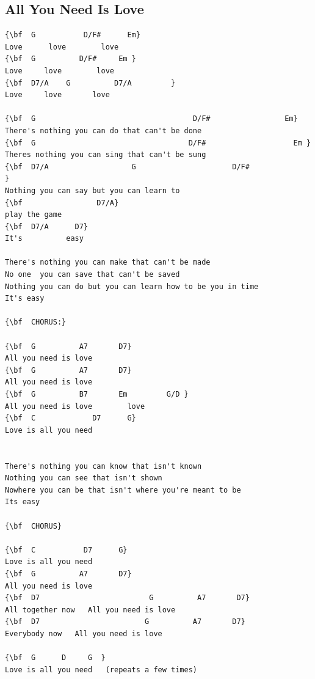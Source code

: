 \documentclass[a4paper]{article}
\begin{document}
\subsection{All You Need Is Love}
\begin{Verbatim}[commandchars=\\\{\}]
{\bf  G           D/F#      Em}
Love      love        love     
{\bf  G          D/F#     Em }
Love     love        love      
{\bf  D7/A    G          D7/A         }
Love     love       love

{\bf  G                                    D/F#                 Em}
There's nothing you can do that can't be done
{\bf  G                                   D/F#                    Em }
Theres nothing you can sing that can't be sung
{\bf  D7/A                   G                      D/F#                    }
Nothing you can say but you can learn to
{\bf                 D7/A}
play the game
{\bf  D7/A      D7}
It's          easy

There's nothing you can make that can't be made
No one  you can save that can't be saved
Nothing you can do but you can learn how to be you in time
It's easy

{\bf  CHORUS:}

{\bf  G          A7       D7}
All you need is love
{\bf  G          A7       D7}
All you need is love
{\bf  G          B7       Em         G/D }
All you need is love        love
{\bf  C             D7      G}
Love is all you need


There's nothing you can know that isn't known
Nothing you can see that isn't shown
Nowhere you can be that isn't where you're meant to be
Its easy

{\bf  CHORUS}

{\bf  C           D7      G}
Love is all you need   
{\bf  G          A7       D7}
All you need is love
{\bf  D7                         G          A7       D7}
All together now   All you need is love
{\bf  D7                        G          A7       D7}
Everybody now   All you need is love 

{\bf  G      D     G  }
Love is all you need   (repeats a few times)

\end{Verbatim}
\newpage
\end{document}
